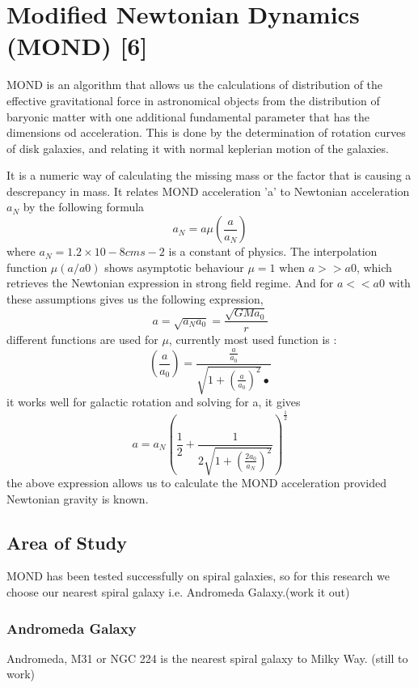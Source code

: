 \chapter{Modified Newtonian Dynamics (MOND) [6]}

MOND is an algorithm that allows us the calculations of distribution of the effective gravitational force in astronomical objects from the distribution of baryonic matter with one additional fundamental parameter that has the dimensions od acceleration. This  is done by the determination of rotation curves of disk galaxies, and relating it with normal keplerian motion of the galaxies.

 It is a numeric way of calculating the missing mass or the factor that is causing a descrepancy in mass. It relates MOND acceleration 'a' to Newtonian acceleration $a_{N}$ by the following formula \begin{equation}
 a_{N}= a\mu(\frac{a}{a_{N}})
\end{equation}
where $a_{N} = 1.2×10-8  cms-2$  is a constant of physics.
The interpolation function $\mu (a/a0)$ shows asymptotic behaviour $\mu=1$ when $a>> a0$,  which retrieves the Newtonian expression in strong field regime. And for $a << a0$ with these assumptions gives us the following expression,
\begin{equation}
a= \sqrt{a_{N}a_{0}}= \frac{\sqrt{GMa_{0}}}{r}
\end{equation}
different functions are used for $\mu$, currently most used function is :
\begin{equation}
(\frac{a}{a_{0}}) = \frac{\frac{a}{a_{0}}}{\sqrt{1+(\frac{a}{a_{0}})^2}•}
\end{equation}
it works well for galactic rotation and solving for a, it gives
\begin{equation}
a= a_{N}(\frac{1}{2}+\frac{1}{2\sqrt{1+(\frac{2a_{0}}{a_{N}})^2}})^\frac{1}{2}
\end{equation}
the above expression allows us to calculate the MOND acceleration provided Newtonian gravity is known.

\section{Area of Study}
  MOND has been tested successfully on spiral galaxies, so for this research we choose our nearest spiral galaxy i.e. Andromeda Galaxy.(work it out)

\subsection{Andromeda Galaxy}
  Andromeda, M31 or NGC 224 is the nearest spiral galaxy to Milky Way.  (still to work)

